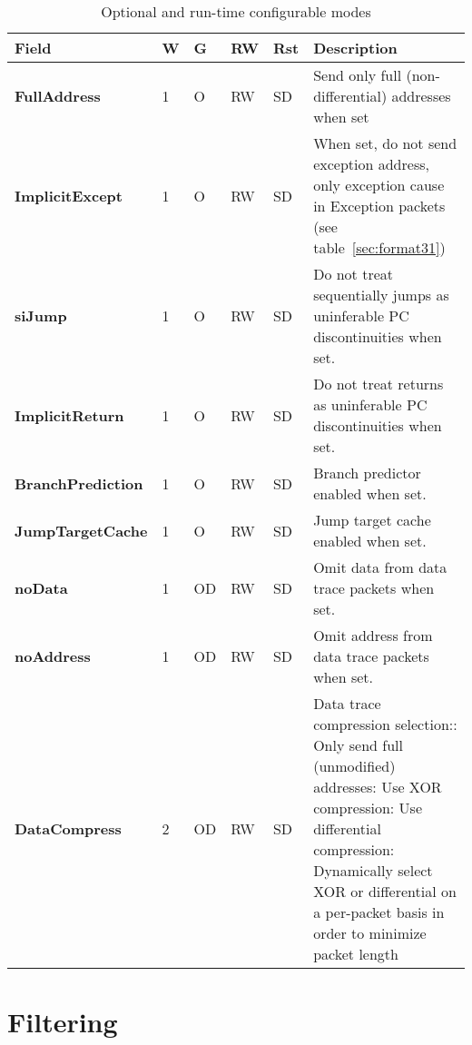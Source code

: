 \begin{table}[htp]
  \centering
  \caption{Optional and run-time configurable modes}
  \label{tab:ctl-resync}
  \begin{tabulary}{\textwidth}{|l|l|l|l|l|p{80mm}|}
    \hline
    {\bf Field} & {\bf W} & {\bf G} & {\bf RW} & {\bf Rst} & {\bf Description} \\
    \hline
    \textbf{FullAddress} & 1 & O & RW & SD & Send only full (non-differential) addresses when set\\
    \hline
    \textbf{ImplicitExcept} & 1 & O & RW & SD & When set, do not send exception address, only exception cause in 
      Exception packets (see table~\ref{sec:format31})\\
    \hline
    \textbf{siJump} & 1 & O & RW & SD & Do not treat sequentially {\color{red}{inferable}} jumps as uninferable PC discontinuities when set.\\
    \hline
    \textbf{ImplicitReturn} & 1 & O & RW & SD & Do not treat returns as uninferable PC discontinuities when set.\\
    \hline
    \textbf{BranchPrediction} & 1 & O & RW & SD & Branch predictor enabled when set.\\
    \hline
    \textbf{JumpTargetCache} & 1 & O & RW & SD & Jump target cache enabled when set.\\
    \hline
    \textbf{noData} & 1 & OD & RW & SD & Omit data from data trace packets when set.\\
    \hline
    \textbf{noAddress} & 1 & OD & RW & SD & Omit address from data trace packets when set.\\
    \hline
    \textbf{DataCompress} & 2 & OD & RW & SD & Data trace compression selection:: Only send full (unmodified) addresses: Use XOR compression: Use differential compression: Dynamically select XOR or differential on a per-packet basis in order to minimize packet length\\
    \hline
  \end{tabulary}
\end{table}


\section{Filtering} \label{sec:ctl-filter}

